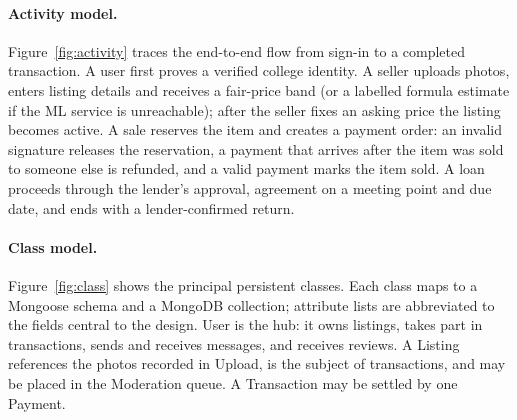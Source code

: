\documentclass[12pt,letterpaper,twoside,openany]{report}
\begin{document}
\paragraph{Activity model.} Figure~\ref{fig:activity} traces the end-to-end flow from sign-in to a
completed transaction. A user first proves a verified college identity. A seller uploads photos, enters
listing details and receives a fair-price band (or a labelled formula estimate if the ML service is
unreachable); after the seller fixes an asking price the listing becomes active. A sale reserves the item
and creates a payment order: an invalid signature releases the reservation, a payment that arrives after
the item was sold to someone else is refunded, and a valid payment marks the item sold. A loan proceeds
through the lender's approval, agreement on a meeting point and due date, and ends with a
lender-confirmed return.

\paragraph{Class model.} Figure~\ref{fig:class} shows the principal persistent classes. Each class maps to
a Mongoose schema and a MongoDB collection; attribute lists are abbreviated to the fields central to the
design. User is the hub: it owns listings, takes part in transactions, sends and receives messages, and
receives reviews. A Listing references the photos recorded in Upload, is the subject of transactions, and
may be placed in the Moderation queue. A Transaction may be settled by one Payment.
\end{document}
